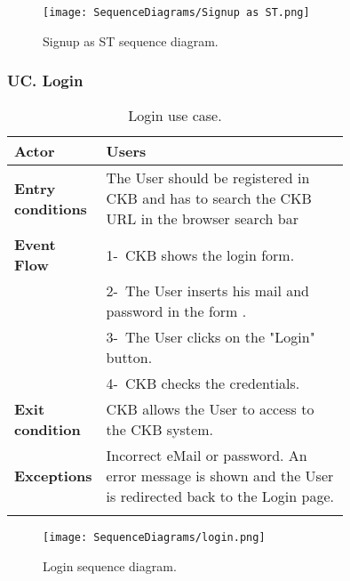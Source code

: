 \begin{figure}[H]
    \begin{center}
        \texttt{[image: SequenceDiagrams/Signup as ST.png]}
        \caption{Signup as ST sequence diagram.}
        \label{fig:signup_as_ST_seqd}%
    \end{center}
\end{figure}

\subsubsection*{UC\cuc . Login}
\begin{center}
    \begin{longtable}{|l|p{0.75\linewidth}|}
        \hline
        \textbf{Actor}            & Users\\
        \hline
        \textbf{Entry conditions} & The User should be registered in CKB and has to search the CKB URL in the browser search bar \\
        \hline
        \textbf{Event Flow}       & 1-\ CKB shows the login form.  \\
        & 2-\ The User inserts his mail and password in the form .\\
        & 3-\ The User clicks on the "Login" button.       \\                               
        & 4-\ CKB checks the credentials.  \\
        \hline
        \textbf{Exit condition}   & CKB allows the User to access to the CKB system. \\
        \hline
        \textbf{Exceptions}       & Incorrect eMail or password. An error message is shown and the User is redirected back to the Login page. \\
        \hline
        \caption{Login use case.}
        \label{tab: login_use_case}
    \end{longtable}
\end{center}

\begin{figure}[H]
    \begin{center}
        \texttt{[image: SequenceDiagrams/login.png]}
        \caption{Login sequence diagram.}
        \label{fig:login_seqd}%
    \end{center}
\end{figure}


